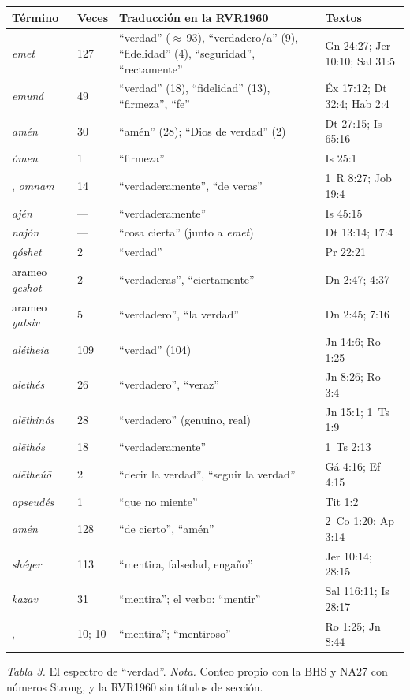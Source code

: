 \begin{center}\small\renewcommand{\arraystretch}{1.16}
\begin{tabular}{@{}L{3.6cm}L{1.1cm}L{5.4cm}L{4.2cm}@{}}
\toprule
\textbf{Término} & \textbf{Veces} & \textbf{Traducción en la RVR1960} & \textbf{Textos} \\ \midrule
{} \emph{emet} & 127 & ``verdad'' ($\approx$\,93), ``verdadero/a'' (9), ``fidelidad'' (4), ``seguridad'', ``rectamente'' & Gn 24:27; Jer 10:10; Sal 31:5 \\
 \emph{emuná} & 49 & ``verdad'' (18), ``fidelidad'' (13), ``firmeza'', ``fe'' & Éx 17:12; Dt 32:4; Hab 2:4 \\
 \emph{amén} & 30 & ``amén'' (28); ``Dios de verdad'' (2) & Dt 27:15; Is 65:16 \\
 \emph{ómen} & 1 & ``firmeza'' & Is 25:1 \\
,  \emph{omnam} & 14 & ``verdaderamente'', ``de veras'' & 1~R 8:27; Job 19:4 \\
 \emph{ajén} & --- & ``verdaderamente'' & Is 45:15 \\
 \emph{najón} & --- & ``cosa cierta'' (junto a \emph{emet}) & Dt 13:14; 17:4 \\
 \emph{qóshet} & 2 & ``verdad'' & Pr 22:21 \\
arameo  \emph{qeshot} & 2 & ``verdaderas'', ``ciertamente'' & Dn 2:47; 4:37 \\
arameo  \emph{yatsiv} & 5 & ``verdadero'', ``la verdad'' & Dn 2:45; 7:16 \\ \midrule
{} \emph{alétheia} & 109 & ``verdad'' (104) & Jn 14:6; Ro 1:25 \\
 \emph{alēthés} & 26 & ``verdadero'', ``veraz'' & Jn 8:26; Ro 3:4 \\
 \emph{alēthinós} & 28 & ``verdadero'' (genuino, real) & Jn 15:1; 1~Ts 1:9 \\
 \emph{alēthós} & 18 & ``verdaderamente'' & 1~Ts 2:13 \\
 \emph{alētheúō} & 2 & ``decir la verdad'', ``seguir la verdad'' & Gá 4:16; Ef 4:15 \\
 \emph{apseudés} & 1 & ``que no miente'' & Tit 1:2 \\
 \emph{amén} & 128 & ``de cierto'', ``amén'' & 2~Co 1:20; Ap 3:14 \\ \midrule
{} \emph{shéqer} & 113 & ``mentira, falsedad, engaño'' & Jer 10:14; 28:15 \\
 \emph{kazav} & 31 & ``mentira''; el verbo: ``mentir'' & Sal 116:11; Is 28:17 \\
,  & 10; 10 & ``mentira''; ``mentiroso'' & Ro 1:25; Jn 8:44 \\
\bottomrule
\end{tabular}\par
{\footnotesize\color{gris}\textit{Tabla 3.} El espectro de ``verdad''. \textit{Nota.} Conteo propio con la BHS y NA27 con números Strong, y la RVR1960 sin títulos de sección.}
\end{center}

